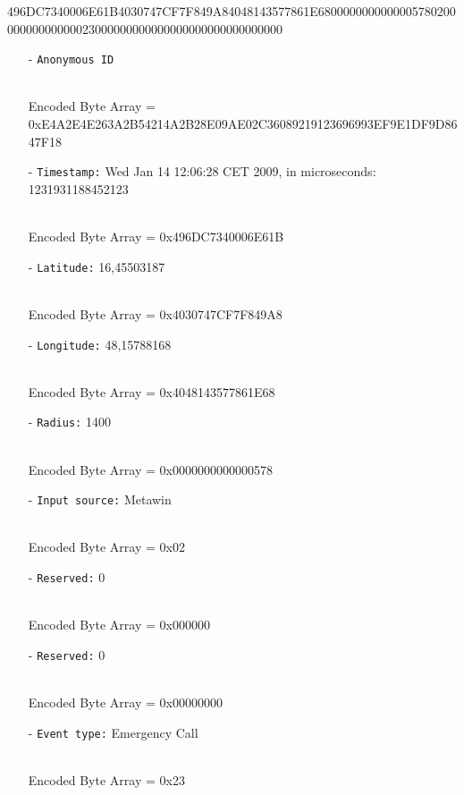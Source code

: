 \documentclass[master,english]{hgbthesis}
\begin{document}
496DC7340006E61B4030747CF7F849A84048143577861E6800000000000005780200\\

00000000000023000000000000000000000000000000

\begin{itemize}

	\item[-] \verb+Anonymous ID+

	      \\Encoded Byte Array = 0xE4A2E4E263A2B54214A2B28E09\-AE02C360\-89219123696993EF9E1DF9D8647F18

	\item[-] \verb|Timestamp:| Wed Jan 14 12:06:28 CET 2009, in microseconds: 1231931188452123

	      \\Encoded Byte Array = 0x496DC7340006E61B

	\item[-] \verb|Latitude:| 16,45503187

	      \\Encoded Byte Array = 0x4030747CF7F849A8

	\item[-] \verb|Longitude:| 48,15788168

	      \\Encoded Byte Array = 0x4048143577861E68

	\item[-] \verb|Radius:| 1400

	      \\Encoded Byte Array = 0x0000000000000578

	\item[-] \verb|Input source:| Metawin

	      \\Encoded Byte Array = 0x02

	\item[-] \verb|Reserved:| 0

	      \\Encoded Byte Array = 0x000000

	\item[-] \verb|Reserved:| 0

	      \\Encoded Byte Array = 0x00000000

	\item[-] \verb|Event type:| Emergency Call

	      \\Encoded Byte Array = 0x23


\end{itemize}
\end{document}
